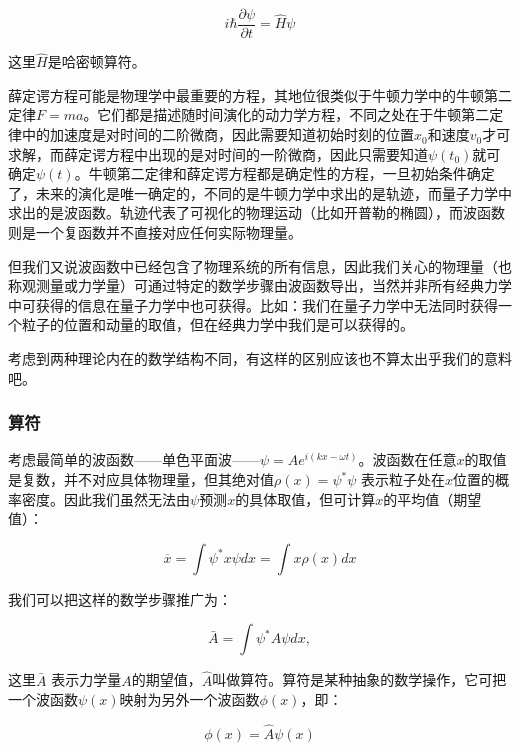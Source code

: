 \begin{equation}
i \hbar \frac{\partial \psi}{\partial t} = \hat H \psi
\end{equation}

这里$\hat H$是哈密顿算符。

薛定谔方程可能是物理学中最重要的方程，其地位很类似于牛顿力学中的牛顿第二定律$F=ma$。它们都是描述随时间演化的动力学方程，不同之处在于牛顿第二定律中的加速度是对时间的二阶微商，因此需要知道初始时刻的位置$x_0$和速度$v_0$才可求解，而薛定谔方程中出现的是对时间的一阶微商，因此只需要知道$\psi(t_0)$就可确定$\psi(t)$。牛顿第二定律和薛定谔方程都是确定性的方程，一旦初始条件确定了，未来的演化是唯一确定的，不同的是牛顿力学中求出的是轨迹，而量子力学中求出的是波函数。轨迹代表了可视化的物理运动（比如开普勒的椭圆），而波函数则是一个复函数并不直接对应任何实际物理量。

但我们又说波函数中已经包含了物理系统的所有信息，因此我们关心的物理量（也称观测量或力学量）可通过特定的数学步骤由波函数导出，当然并非所有经典力学中可获得的信息在量子力学中也可获得。比如：我们在量子力学中无法同时获得一个粒子的位置和动量的取值，但在经典力学中我们是可以获得的。

考虑到两种理论内在的数学结构不同，有这样的区别应该也不算太出乎我们的意料吧。


\subsubsection{算符}

考虑最简单的波函数——单色平面波——$\psi = A e^{i(kx - \omega t)}$。波函数在任意$x$的取值是复数，并不对应具体物理量，但其绝对值$\rho(x) = \psi^* \psi $ 表示粒子处在$x$位置的概率密度。因此我们虽然无法由$\psi$预测$x$的具体取值，但可计算$x$的平均值（期望值）：

\begin{equation}
\overline{x} = \int \psi^* x \psi dx = \int x \rho(x) dx
\end{equation}

我们可以把这样的数学步骤推广为：

\begin{equation}
\bar A = \int \psi^* A \psi dx,
\end{equation}

这里$\bar A$ 表示力学量$A$的期望值，$\hat A$叫做算符。算符是某种抽象的数学操作，它可把一个波函数$\psi(x)$映射为另外一个波函数$\phi(x)$，即：

\begin{equation}
\phi(x) = \hat A \psi(x)
\end{equation}

